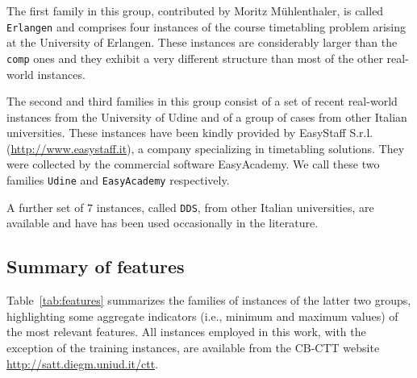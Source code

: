 \documentclass[authoryear,12pt]{article}
\begin{document}
The first family in this group, contributed by Moritz M\"uhlenthaler, is called
\texttt{Erlangen} and comprises four instances of the course timetabling problem
arising at the University of Erlangen. These instances are considerably larger
than the \texttt{comp} ones and they exhibit a very different structure than
most of the other real-world instances.

The second and third families in this group consist of a set of recent
real-world instances from the University of Udine and of a group of cases from
other Italian universities. These instances have been kindly provided by
EasyStaff S.r.l. (\url{http://www.easystaff.it}), a company specializing in
timetabling solutions. They were collected by the commercial software
EasyAcademy.  We call these two families \texttt{Udine} and \texttt{EasyAcademy}
respectively.

A further set of $7$ instances, called \texttt{DDS}, from other Italian
universities, are available and have has been used occasionally in the
literature.

\subsection{Summary of features}

Table~\ref{tab:features} summarizes the families of instances of the latter two
groups, highlighting some aggregate indicators (i.e., minimum and maximum
values) of the most relevant features.  All instances employed in this work,
with the exception of the training instances, are available from the CB-CTT
website \url{http://satt.diegm.uniud.it/ctt}.
\end{document}
